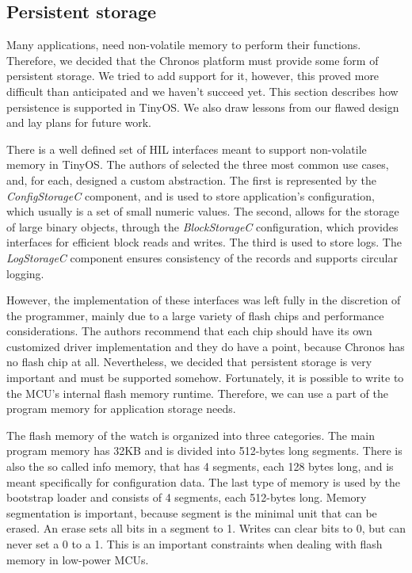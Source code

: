 \subsection{Persistent storage}

Many applications, need non-volatile memory to perform their functions. Therefore, we decided that the Chronos platform must provide some form of persistent storage. We tried to add support for it, however, this proved more difficult than anticipated and we haven't succeed yet. This section describes how persistence is supported in TinyOS. We also draw lessons from our flawed design and lay plans for future work.

There is a well defined set of HIL interfaces meant to support non-volatile memory in TinyOS. The authors of \cite{TEP103} selected the three most common use cases, and, for each, designed a custom abstraction. The first is represented by the \emph{ConfigStorageC} component, and is used to store application's configuration, which usually is a set of small numeric values. The second, allows for the storage of large binary objects, through the \emph{BlockStorageC} configuration, which provides interfaces for efficient block reads and writes. The third is used to store logs. The \emph{LogStorageC} component ensures consistency of the records and supports circular logging.

However, the implementation of these interfaces was left fully in the discretion of the programmer, mainly due to a large variety of flash chips and performance considerations. The authors recommend that each chip should have its own customized driver implementation and they do have a point, because Chronos has no flash chip at all. Nevertheless, we decided that persistent storage is very important and must be supported somehow. Fortunately, it is possible to write to the MCU's internal flash memory runtime. Therefore, we can use a part of the program memory for application storage needs.

The flash memory of the watch is organized into three categories. The main program memory has 32KB and is divided into 512-bytes long segments. There is also the so called info memory, that has 4 segments, each 128 bytes long, and is meant specifically for configuration data. The last type of memory is used by the bootstrap loader and consists of 4 segments, each 512-bytes long. Memory segmentation is important, because segment is the minimal unit that can be erased. An erase sets all bits in a segment to 1. Writes can clear bits to 0, but can never set a 0 to a 1. This is an important constraints when dealing with flash memory in low-power MCUs.

